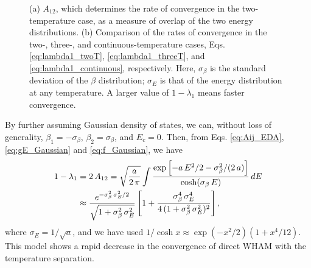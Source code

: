 \documentclass[reprint,aip,jcp,superscriptaddress]{revtex4-1}
\begin{document}
\begin{figure}[h]
  \caption{\label{fig:gausconv}
    (a) $A_{12}$,
    which determines the rate of convergence
    in the two-temperature case,
    as a measure of overlap
    of the two energy distributions.
    (b) Comparison of the rates of convergence
    in the two-, three-,
    and continuous-temperature cases,
    Eqs. \eqref{eq:lambda1_twoT},
    \eqref{eq:lambda1_threeT},
    and
    \eqref{eq:lambda1_continuous},
    respectively.
    Here,
    $\sigma_\beta$
    is the standard deviation of the $\beta$ distribution;
    $\sigma_E$
    is that of the energy distribution
    at any temperature.
    A larger value of $1 - \lambda_1$
    means faster convergence.
  }
\end{figure}



By further assuming Gaussian density of states,
we can, without loss of generality,
$\beta_1 = -\sigma_\beta$,
$\beta_2 = \sigma_\beta$,
and $E_c = 0$.
%
Then, from
Eqs. \eqref{eq:Aij_EDA},
\eqref{eq:gE_Gaussian}
and \eqref{eq:f_Gaussian},
we have
%
\begin{align}
1 - \lambda_1
&= 2 \, A_{12}
=
\sqrt \frac{ a } { 2 \, \pi }
\int
\frac
{
  \exp\left[
    -a \, E^2/2
    -\sigma_\beta^2 / (2 \, a)
  \right]
}
{ \cosh( \sigma_\beta \, E ) }
\, dE
\notag \\
%
&\approx\frac{ e^{-\sigma_\beta^2 \, \sigma_E^2/2} }
{ \sqrt{ 1 + \sigma_\beta^2 \, \sigma_E^2 } }
\left[
  1 + \frac{ \sigma_\beta^4 \, \sigma_E^4 }
  {4\,(1 + \sigma_\beta^2 \, \sigma_E^2)^2 }
\right],
\label{eq:lambda1_twoT}
\end{align}
%
where
$\sigma_E = 1/\sqrt{a}$,
%
and we have used
$1/\cosh x \approx \exp(-x^2/2)(1 + x^4/12)$.
%
This model shows
a rapid decrease in
the convergence of direct WHAM
with the temperature separation.
\end{document}
